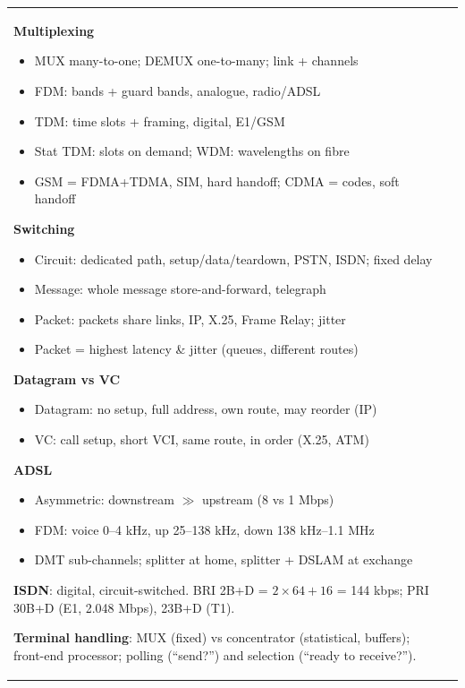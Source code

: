 \documentclass[10pt]{article}
\begin{document}
\begin{cheatsheet}
\begin{tabularx}{\linewidth}{@{}XX@{}}
\textbf{Multiplexing}
\begin{itemize}
\item MUX many-to-one; DEMUX one-to-many; link + channels
\item FDM: bands + guard bands, analogue, radio/ADSL
\item TDM: time slots + framing, digital, E1/GSM
\item Stat TDM: slots on demand; WDM: wavelengths on fibre
\item GSM = FDMA+TDMA, SIM, hard handoff; CDMA = codes, soft handoff
\end{itemize}
\textbf{Switching}
\begin{itemize}
\item Circuit: dedicated path, setup/data/teardown, PSTN, ISDN; fixed delay
\item Message: whole message store-and-forward, telegraph
\item Packet: packets share links, IP, X.25, Frame Relay; jitter
\item Packet = highest latency \& jitter (queues, different routes)
\end{itemize}
\textbf{Datagram vs VC}
\begin{itemize}
\item Datagram: no setup, full address, own route, may reorder (IP)
\item VC: call setup, short VCI, same route, in order (X.25, ATM)
\end{itemize}
\textbf{ADSL}
\begin{itemize}
\item Asymmetric: downstream $\gg$ upstream (8 vs 1 Mbps)
\item FDM: voice 0--4 kHz, up 25--138 kHz, down 138 kHz--1.1 MHz
\item DMT sub-channels; splitter at home, splitter + DSLAM at exchange
\end{itemize}
\textbf{ISDN}: digital, circuit-switched. BRI 2B+D = $2\times64+16$ = 144 kbps; PRI 30B+D (E1, 2.048 Mbps), 23B+D (T1).\par
\textbf{Terminal handling}: MUX (fixed) vs concentrator (statistical, buffers); front-end processor; polling (``send?'') and selection (``ready to receive?'').
\end{tabularx}
\end{cheatsheet}
\end{document}
